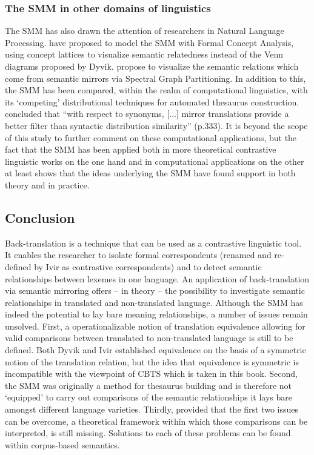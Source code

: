 \subsubsection{\label{sec:2.3.4.5}  The SMM in other domains of linguistics}

The SMM has also drawn the attention of researchers in Natural Language Processing. \citet{ganter_conceptual_2005} have proposed to model the SMM with Formal Concept Analysis, using concept lattices to visualize semantic relatedness instead of the Venn diagrams proposed by Dyvik. \citet{elden_computing_2013} propose to visualize the semantic relations which come from semantic mirrors via Spectral Graph Partitioning. In addition to this, the SMM has been compared, within the realm of computational linguistics, with its ‘competing’ distributional techniques for automated thesaurus construction. \citet{butz_comparing_2011} concluded that “with respect to synonyms, [...] mirror translations provide a better filter than syntactic distribution similarity” (p.333). It is beyond the scope of this study to further comment on these computational applications, but the fact that the SMM has been applied both in more theoretical contrastive linguistic works on the one hand and in computational applications on the other at least shows that the ideas underlying the SMM have found support in both theory and in practice.


\subsection{\label{sec:2.3.5}  Conclusion}

Back-translation is a technique that can be used as a contrastive linguistic tool. It enables the researcher to isolate formal correspondents (renamed and re-defined by Ivir as contrastive correspondents) and to detect semantic relationships between lexemes in one language. An application of back-translation via semantic mirroring offers – in theory – the possibility to investigate semantic relationships in translated and non-translated language. Although the SMM has indeed the potential to lay bare meaning relationships, a number of issues remain unsolved. First, a operationalizable notion of translation equivalence allowing for valid comparisons between translated to non-translated language is still to be defined. Both Dyvik and Ivir established equivalence on the basis of a symmetric notion of the translation relation, but the idea that equivalence is symmetric is incompatible with the viewpoint of CBTS which is taken in this book. Second, the SMM was originally a method for thesaurus building and is therefore not ‘equipped’ to carry out comparisons of the semantic relationships it lays bare amongst different language varieties. Thirdly, provided that the first two issues can be overcome, a theoretical framework within which those comparisons can be interpreted, is still missing. Solutions to each of these problems can be found within corpus-based semantics.


